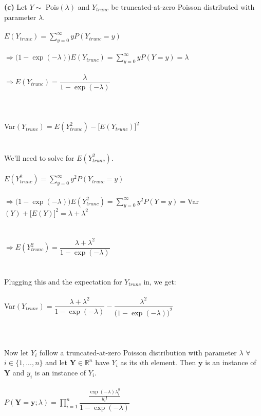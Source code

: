 \documentclass[submit]{harvardml}
\newcommand{\R}{\mathbb{R}}
\begin{document}
\textbf{(c)} Let $Y\sim$ Pois$(\lambda)$ and $Y_{trunc}$ be truncated-at-zero Poisson distributed with parameter $\lambda$.\\\\
$E(Y_{trunc})=\displaystyle\sum_{y=0}^{\infty}yP(Y_{trunc}=y)$\\\\
$\Rightarrow\big(1-\exp(-\lambda)\big) E(Y_{trunc})=\displaystyle\sum_{y=0}^{\infty}yP(Y=y)=\lambda$\\\\
$\Rightarrow E(Y_{trunc})=\dfrac{\lambda}{1-\exp(-\lambda)}$\\\\\\\\
Var$(Y_{trunc})=E(Y_{trunc}^2)-\big[E(Y_{trunc})\big]^2$\\\\\\
We'll need to solve for $E(Y_{trunc}^2)$.\\\\
$E(Y_{trunc}^2)=\displaystyle\sum_{y=0}^{\infty}y^2P(Y_{trunc}=y)$\\\\
$\Rightarrow\big(1-\exp(-\lambda)\big) E(Y_{trunc}^2)=\displaystyle\sum_{y=0}^{\infty}y^2P(Y=y)=$Var$(Y)+\big[E(Y)\big]^2=\lambda+\lambda^2$\\\\\\
$\Rightarrow E(Y_{trunc}^2)=\dfrac{\lambda+\lambda^2}{1-\exp(-\lambda)}$\\\\\\
Plugging this and the expectation for $Y_{trunc}$ in, we get:\\\\ Var$(Y_{trunc})=\dfrac{\lambda+\lambda^2}{1-\exp(-\lambda)}-\dfrac{\lambda^2}{\big(1-\exp(-\lambda)\big)^2}$\\\\\\\\
Now let $Y_i$ follow a truncated-at-zero Poisson distribution with parameter $\lambda$ $\forall$ $i\in\{1,...,n\}$ and let $\mathbf{Y}\in\R^n$ have $Y_i$ as its $i$th element. Then $\mathbf{y}$ is an instance of $\mathbf{Y}$ and $y_i$ is an instance of $Y_i$.\\\\
$P(\mathbf{Y}=\mathbf{y};\lambda)=\displaystyle\prod_{i=1}^{n}\dfrac{\frac{\exp(-\lambda)\lambda^y_i}{y_i!}}{1-\exp(-\lambda)}$\\\\\\
\end{document}
